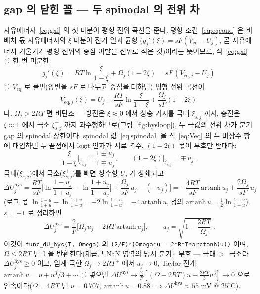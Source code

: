 \documentclass[11pt,a4paper]{article}
\newcommand{\eq}{\mathrm{eq}}
\newcommand{\hys}{\mathrm{hys}}
\newcommand{\code}[1]{\texttt{#1}}
\begin{document}
\subsection{gap 의 닫힌 꼴 — 두 spinodal 의 전위 차}
자유에너지~\eqref{eq:gxi} 의 첫 미분이 평형 전위 곡선을 준다. 평형 조건~\eqref{eq:eqcond} 은 비배치 몫 자유에너지의
$\xi$ 미분이 전기 일과 균형 ($g_j'(\xi)=sF(V_\eq-U_j)$, 곧 자유에너지 기울기가 평형 전위의 중심 이탈을 전위로 적은 것)이라는
뜻이므로, 식~\eqref{eq:gxi} 를 한 번 미분한
\begin{equation}
g_j'(\xi)=RT\ln\frac{\xi}{1-\xi}+\Omega_j(1-2\xi)=sF\,(V_{\eq,j}-U_j)
\label{eq:gprime}
\end{equation}
를 $V_\eq$ 로 풀면(양변을 $sF$ 로 나누고 중심을 더하면) 평형 전위 곡선이
\begin{equation}
V_{\eq,j}(\xi)=U_j+\frac{RT}{sF}\ln\frac{\xi}{1-\xi}+\frac{\Omega_j}{sF}(1-2\xi)
\label{eq:Veq}
\end{equation}
다. $\Omega_j>2RT$ 면 비단조 --- 방전은 $\xi\!\approx\!0$ 에서 상승 가지를 극대 $\xi_{s,j}^-$ 까지, 충전은 $\xi\!\approx\!1$
에서 극소 $\xi_{s,j}^+$ 까지 과주행하므로(그림~\ref{fig:hysloop}), 두 극값의 전위 차가 분기 gap 의 spinodal 상한이다.
spinodal 값~\eqref{eq:spinodal} 을 식~\eqref{eq:Veq} 의 두 비상수 항에 대입하면 두 끝점에서 logit 인자가 서로 역수,
$(1-2\xi)$ 몫이 부호만 반대다:
\begin{equation}
\frac{\xi}{1-\xi}\bigg|_{\xi_{s,j}^\pm}=\frac{1\pm u_j}{1\mp u_j},
\qquad
(1-2\xi)\big|_{\xi_{s,j}^\pm}=\mp\,u_j.
\label{eq:hyssub}
\end{equation}
극대($\xi_{s,j}^-$)에서 극소($\xi_{s,j}^+$)를 빼면 상수항 $U_j$ 가 상쇄되고
\begin{equation}
\Delta U_j^\hys
=\frac{RT}{sF}\Big[\ln\frac{1-u_j}{1+u_j}-\ln\frac{1+u_j}{1-u_j}\Big]
+\frac{\Omega_j}{sF}\big[u_j-(-u_j)\big]
=-\frac{4RT}{sF}\,\mathrm{artanh}\,u_j+\frac{2\Omega_j}{sF}\,u_j
\label{eq:hysdiff}
\end{equation}
(로그 몫 $\ln\frac{1-u}{1+u}-\ln\frac{1+u}{1-u}=-2\ln\frac{1+u}{1-u}=-4\,\mathrm{artanh}\,u$, 정의
$\mathrm{artanh}\,u=\tfrac12\ln\tfrac{1+u}{1-u}$). $s=+1$ 로 정리하면
\begin{equation}
\boxed{\;\Delta U_j^\hys
=\frac{2}{F}\Big[\Omega_j\,u_j-2RT\,\mathrm{artanh}\,u_j\Big],
\qquad u_j=\sqrt{1-\frac{2RT}{\Omega_j}}\;.}
\label{eq:dUhys}
\end{equation}
이것이 \code{func\_dU\_hys(T, Omega)} 의 \code{(2/F)*(Omega*u - 2*R*T*arctanh(u))} 이며, $\Omega\le2RT$ 면 $0$ 을
반환한다(제곱근 NaN 영역의 명시 분기). 부호 --- 극대 $>$ 극소라 $\Delta U_j^\hys\ge0$ 이고, 임계 극한
$\Omega_j\to2RT^+$ 에서 $u_j\to0$, Taylor 전개 $\mathrm{artanh}\,u=u+u^3/3+\cdots$ 를 넣으면
$\Delta U^\hys\to\tfrac{2}{F}[(\Omega-2RT)u-\tfrac{2RT}{3}u^3]\to0$ 으로 연속이다($\Omega=4RT$ 면 $u=0.707$,
$\mathrm{artanh}\,u=0.881\Rightarrow\Delta U^\hys\approx55$ mV @ $25^\circ$C).
\end{document}
